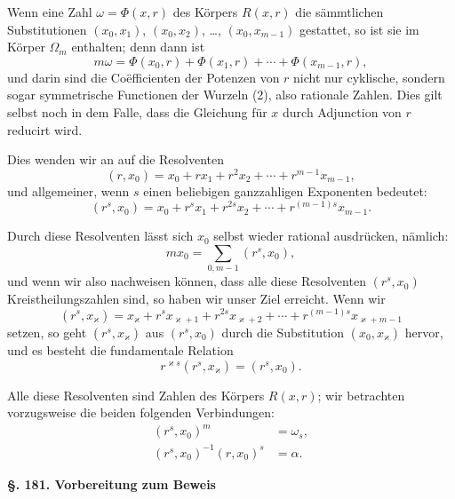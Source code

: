 \documentclass[12pt,a4paper]{article}
\begin{document}
Wenn eine Zahl $\omega = \Phi(x, r)$ des Körpers $R(x, r)$ die sämmtlichen Substitutionen $(x_0, x_1)$, $(x_0, x_2)$, \ldots, $(x_0, x_{m-1})$ gestattet, so ist sie im Körper $\Omega_m$ enthalten; denn dann ist
\[
m\omega = \Phi(x_0, r) + \Phi(x_1, r) + \cdots + \Phi(x_{m-1}, r),
\]
und darin sind die Coëfficienten der Potenzen von $r$ nicht nur cyklische, sondern sogar symmetrische Functionen der Wurzeln (2), also rationale Zahlen. Dies gilt selbst noch in dem Falle, dass die Gleichung für $x$ durch Adjunction von $r$ reducirt wird.

Dies wenden wir an auf die Resolventen
\begin{equation}\label{eq:180-3}
(r, x_0) = x_0 + r x_1 + r^2 x_2 + \cdots + r^{m-1} x_{m-1},
\end{equation}
und allgemeiner, wenn $s$ einen beliebigen ganzzahligen Exponenten bedeutet:
\begin{equation}\label{eq:180-4}
(r^s, x_0) = x_0 + r^s x_1 + r^{2s} x_2 + \cdots + r^{(m-1)s} x_{m-1}.
\end{equation}

Durch diese Resolventen lässt sich $x_0$ selbst wieder rational ausdrücken, nämlich:
\begin{equation}\label{eq:180-5}
m x_0 = \sum_{0,m-1} (r^s, x_0),
\end{equation}
und wenn wir also nachweisen können, dass alle diese Resolventen $(r^s, x_0)$ Kreistheilungszahlen sind, so haben wir unser Ziel erreicht. Wenn wir
\begin{equation}\label{eq:180-6}
(r^s, x_\varkappa) = x_\varkappa + r^s x_{\varkappa+1} + r^{2s} x_{\varkappa+2} + \cdots + r^{(m-1)s} x_{\varkappa+m-1}
\end{equation}
setzen, so geht $(r^s, x_\varkappa)$ aus $(r^s, x_0)$ durch die Substitution $(x_0, x_\varkappa)$ hervor, und es besteht die fundamentale Relation
\begin{equation}\label{eq:180-7}
r^{\varkappa s}(r^s, x_\varkappa) = (r^s, x_0).
\end{equation}

Alle diese Resolventen sind Zahlen des Körpers $R(x, r)$; wir betrachten vorzugsweise die beiden folgenden Verbindungen:
\begin{align}
(r^s, x_0)^m &= \omega_s,\label{eq:180-8}\\
(r^s, x_0)^{-1}(r, x_0)^s &= \alpha.\label{eq:180-9}
\end{align}

\bigskip\noindent\textbf{\S. 181. Vorbereitung zum Beweis}\\[4pt]
\end{document}
